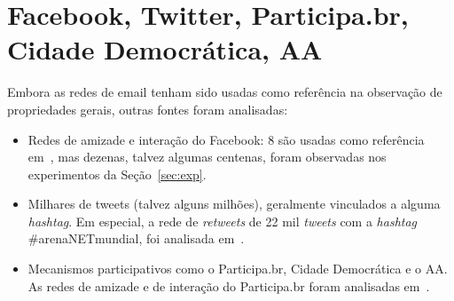 \documentclass[a4paper,openright,12pt]{report} %
\begin{document}
\section{Facebook, Twitter, Participa.br, Cidade Democrática, AA}
Embora as redes de email tenham sido usadas como referência
na observação de propriedades gerais, outras fontes
foram analisadas:

\begin{itemize}
    \item Redes de amizade e interação do Facebook: 8 são usadas como referência em~\cite{timeS}, mas dezenas, talvez algumas centenas, foram observadas nos experimentos da Seção~\ref{sec:exp}.
    \item Milhares de tweets (talvez alguns milhões), geralmente vinculados a alguma \emph{hashtag}. Em especial, a rede de \emph{retweets} de 22 mil \emph{tweets} com a \emph{hashtag} \#arenaNETmundial, foi analisada em~\cite{timeS}.
    \item Mecanismos participativos como o Participa.br, Cidade Democrática e o AA. As redes de amizade e de interação do Participa.br foram analisadas em~\cite{timeS}.
\end{itemize}
\end{document}
